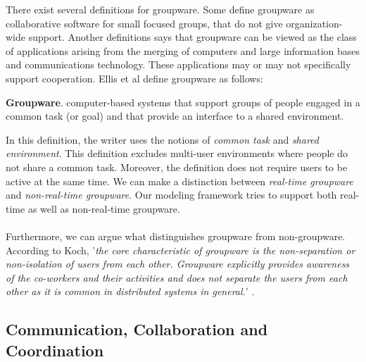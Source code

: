 There exist several definitions for groupware. Some define groupware as collaborative software for small focused groups, that do not give organization-wide support. Another definitions says that groupware can be viewed as the class of applications arising from the merging of computers and large information bases and communications technology. These applications may or may not specifically support cooperation. Ellis et al define groupware as follows:
\begin{mydef}
\textbf{Groupware}. computer-based systems that support groups of people engaged in a common task (or goal) and that provide an interface to a shared environment. \cite{groupware}
\end{mydef}
In this definition, the writer uses the notions of \textit{common task} and \textit{shared environment}. This definition excludes multi-user environments where people do not share a common task. Moreover, the definition does not require users to be active at the same time. We can make a distinction between \textit{real-time groupware} and \textit{non-real-time groupware}. Our modeling framework tries to support both real-time as well as non-real-time groupware.
\\ \\
Furthermore, we can argue what distinguishes groupware from non-groupware. According to Koch, '\textit{the core characteristic of groupware is the non-separation or non-isolation of users from each other. Groupware explicitly provides awareness of the co-workers and their activities and does not separate the users from each other as it is common in distributed systems in general.}' \cite{CSCWConcepts}.

\subsection{Communication, Collaboration and Coordination}


